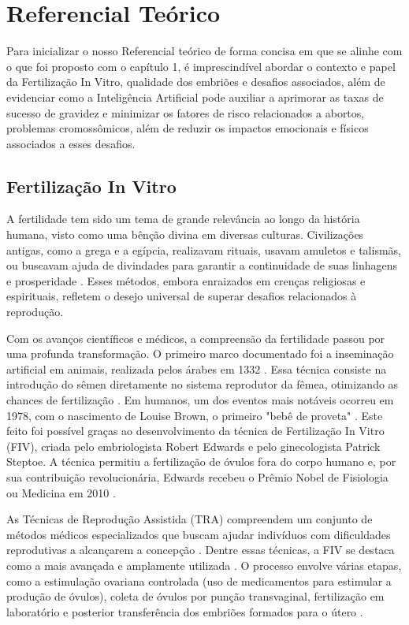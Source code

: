 \chapter[Referencial Teórico]{Referencial Teórico}

Para inicializar o nosso Referencial teórico de forma concisa em que se alinhe com o que foi proposto com o capítulo 1, é imprescindível abordar o contexto e papel da Fertilização In Vitro, qualidade dos embriões e desafios associados, além de evidenciar como a Inteligência Artificial pode auxiliar a aprimorar as taxas de sucesso de gravidez e minimizar os fatores de risco relacionados a abortos, problemas cromossômicos, além de reduzir os impactos emocionais e físicos associados a esses desafios.

\section{Fertilização In Vitro}

A fertilidade tem sido um tema de grande relevância ao longo da história humana, visto como uma bênção divina em diversas culturas. Civilizações antigas, como a grega e a egípcia, realizavam rituais, usavam amuletos e talismãs, ou buscavam ajuda de divindades para garantir a continuidade de suas linhagens e prosperidade \cite{moura2020}. Esses métodos, embora enraizados em crenças religiosas e espirituais, refletem o desejo universal de superar desafios relacionados à reprodução.

Com os avanços científicos e médicos, a compreensão da fertilidade passou por uma profunda transformação. O primeiro marco documentado foi a inseminação artificial em animais, realizada pelos árabes em 1332 \cite{moura2020}. Essa técnica consiste na introdução do sêmen diretamente no sistema reprodutor da fêmea, otimizando as chances de fertilização \cite{corleta2010}. Em humanos, um dos eventos mais notáveis ocorreu em 1978, com o nascimento de Louise Brown, o primeiro "bebê de proveta" \cite{moura2020}. Este feito foi possível graças ao desenvolvimento da técnica de Fertilização In Vitro (FIV), criada pelo embriologista Robert Edwards e pelo ginecologista Patrick Steptoe. A técnica permitiu a fertilização de óvulos fora do corpo humano e, por sua contribuição revolucionária, Edwards recebeu o Prêmio Nobel de Fisiologia ou Medicina em 2010 \cite{corleta2010}.

As Técnicas de Reprodução Assistida (TRA) compreendem um conjunto de métodos médicos especializados que buscam ajudar indivíduos com dificuldades reprodutivas a alcançarem a concepção \cite{souzamarise2024}. Dentre essas técnicas, a FIV se destaca como a mais avançada e amplamente utilizada \cite{moura2020}. O processo envolve várias etapas, como a estimulação ovariana controlada (uso de medicamentos para estimular a produção de óvulos), coleta de óvulos por punção transvaginal, fertilização em laboratório e posterior transferência dos embriões formados para o útero \cite{moura2020}.

